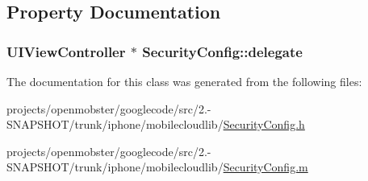 \subsection{\-Property \-Documentation}
\hypertarget{interface_security_config_a4ac32a0caa7ae861728877afc0fb18b0}{
\subsubsection[{delegate}]{\setlength{\rightskip}{0pt plus 5cm}\-U\-I\-View\-Controller $\ast$ \-Security\-Config\-::delegate}}
\label{interface_security_config_a4ac32a0caa7ae861728877afc0fb18b0}


\-The documentation for this class was generated from the following files\-:\begin{DoxyCompactItemize}
\item 
projects/openmobster/googlecode/src/2.-\/\-S\-N\-A\-P\-S\-H\-O\-T/trunk/iphone/mobilecloudlib/\hyperlink{_security_config_8h}{\-Security\-Config.\-h}\item 
projects/openmobster/googlecode/src/2.-\/\-S\-N\-A\-P\-S\-H\-O\-T/trunk/iphone/mobilecloudlib/\hyperlink{_security_config_8m}{\-Security\-Config.\-m}\end{DoxyCompactItemize}
